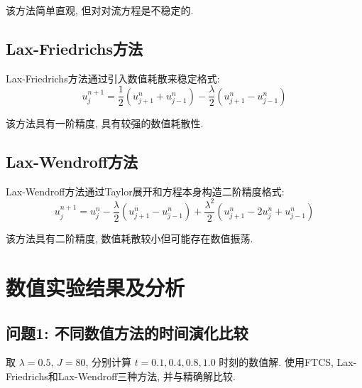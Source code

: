 \documentclass[12pt,a4paper]{article}
\begin{document}
            该方法简单直观, 但对对流方程是不稳定的.

        \subsection{Lax-Friedrichs方法}

            Lax-Friedrichs方法通过引入数值耗散来稳定格式:
            \begin{equation*}
                u_{j}^{n+1} = \frac{1}{2} \left( u_{j+1}^{n} + u_{j-1}^{n} \right) - \frac{\lambda}{2} \left( u_{j+1}^{n} - u_{j-1}^{n} \right)
            \end{equation*}

            该方法具有一阶精度, 具有较强的数值耗散性.

        \subsection{Lax-Wendroff方法}
            Lax-Wendroff方法通过Taylor展开和方程本身构造二阶精度格式:
            \begin{equation*}
                u_{j}^{n+1} = u_{j}^{n} - \frac{\lambda}{2} \left( u_{j+1}^{n} - u_{j-1}^{n} \right) + \frac{\lambda^2}{2} \left( u_{j+1}^{n} - 2u_{j}^{n} + u_{j-1}^{n} \right)
            \end{equation*}

            该方法具有二阶精度, 数值耗散较小但可能存在数值振荡.

    \section{数值实验结果及分析}
        \subsection{问题1: 不同数值方法的时间演化比较}
            取 $ \lambda = 0.5, \, J = 80 $, 分别计算 $ t = 0.1, 0.4, 0.8, 1.0 $ 时刻的数值解. 使用FTCS, Lax-Friedrichs和Lax-Wendroff三种方法, 并与精确解比较.
\end{document}
